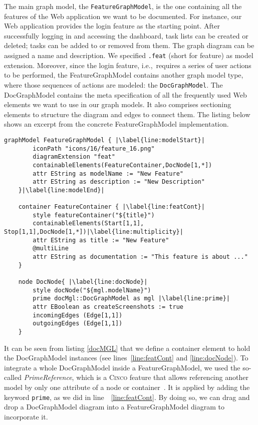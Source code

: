 The main graph model, the \lstinline{FeatureGraphModel}, is the one containing all the features of the Web application we want to be documented. For instance, our  Web application provides the login feature as the starting point. After successfully logging in and accessing the dashboard, task lists can be created or deleted; tasks can be added to or removed from them. The graph diagram can be assigned a name and description. We specified \lstinline{.feat} (short for feature) as model extension. Moreover, since the login feature, i.e.,~requires a series of user actions to be performed, the FeatureGraphModel contains another graph model type, where those sequences of actions are modeled: the \lstinline{DocGraphModel}. The DocGraphModel contains the meta specification of all the frequently used Web elements we want to use in our graph models. It also comprises sectioning elements to structure the diagram and edges to connect them. The listing below shows an excerpt from the concrete FeatureGraphModel implementation.

\begin{lstlisting}[language=MGL, caption={Excerpt from the feature.mgl, meta-specification of the FeatureGraphModel}, label=docMGL, escapechar=|]
    graphModel FeatureGraphModel { |\label{line:modelStart}|
        iconPath "icons/16/feature_16.png"
        diagramExtension "feat"
        containableElements(FeatureContainer,DocNode[1,*])
        attr EString as modelName := "New Feature"
        attr EString as description := "New Description"
    }|\label{line:modelEnd}|
    
    container FeatureContainer { |\label{line:featCont}|
        style featureContainer("${title}")
        containableElements(Start[1,1], Stop[1,1],DocNode[1,*])|\label{line:multiplicity}|
        attr EString as title := "New Feature"
        @multiLine
        attr EString as documentation := "This feature is about ..."
    }
    
    node DocNode{ |\label{line:docNode}|
        style docNode("${mgl.modelName}")
        prime docMgl::DocGraphModel as mgl |\label{line:prime}|
        attr EBoolean as createScreenshots := true
        incomingEdges (Edge[1,1])
        outgoingEdges (Edge[1,1])
    }
\end{lstlisting}

It can be seen from listing \ref{docMGL} that we define a container element to hold the DocGraphModel instances (see lines~\ref{line:featCont} and \ref{line:docNode}). To integrate a whole DocGraphModel inside a FeatureGraphModel, we used the so-called \textit{PrimeReference}, which is a \textsc{Cinco} feature that allows referencing another model by only one attribute of a node or container~\cite{Cinco}. It is applied by adding the keyword \lstinline[language=MGL]{prime}, as we did in line~~\ref{line:featCont}. By doing so, we can drag and drop a DocGraphModel diagram into a FeatureGraphModel diagram to incorporate it.

